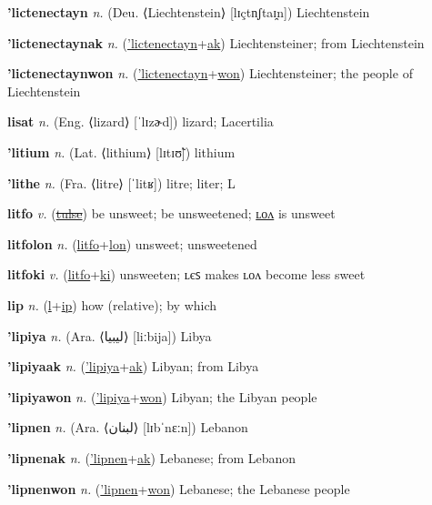 \textbf{\hypertarget{'lictenectayn}{'lictenectayn}} \textit{n.} (Deu. ⟨Liechtenstein⟩ [lɪçtn̩ʃtaɪ̯n])
Liechtenstein

\textbf{\hypertarget{'lictenectaynak}{'lictenectaynak}} \textit{n.} (\hyperlink{'lictenectayn}{'lictenectayn}+\allowbreak \hyperlink{ak}{ak})
Liechtensteiner; from Liechtenstein

\textbf{\hypertarget{'lictenectaynwon}{'lictenectaynwon}} \textit{n.} (\hyperlink{'lictenectayn}{'lictenectayn}+\allowbreak \hyperlink{won}{won})
Liechtensteiner; the people of Liechtenstein

\textbf{\hypertarget{lisat}{lisat}} \textit{n.} (Eng. ⟨lizard⟩ [ˈlɪzɚd])
lizard; Lacertilia

\textbf{\hypertarget{'litium}{'litium}} \textit{n.} (Lat. ⟨lithium⟩ [lɪtɪʊ̃])
lithium

\textbf{\hypertarget{'lithe}{'lithe}} \textit{n.} (Fra. ⟨litre⟩ [ˈlitʁ])
litre; liter; L

\textbf{\hypertarget{litfo}{litfo}} \textit{v.} (\hyperlink{tulse}{\sout{tulse}})
be unsweet; be unsweetened; \hyperlink{litfolon}{ʟᴏᴧ} is unsweet

\textbf{\hypertarget{litfolon}{litfolon}} \textit{n.} (\hyperlink{litfo}{litfo}+\allowbreak \hyperlink{lon}{lon})
unsweet; unsweetened

\textbf{\hypertarget{litfoki}{litfoki}} \textit{v.} (\hyperlink{litfo}{litfo}+\allowbreak \hyperlink{ki}{ki})
unsweeten; ʟєꜱ makes ʟᴏᴧ become less sweet

\textbf{\hypertarget{lip}{lip}} \textit{n.} (\hyperlink{l}{l}+\allowbreak \hyperlink{ip}{ip})
how (relative); by which

\textbf{\hypertarget{'lipiya}{'lipiya}} \textit{n.} (Ara. ⟨{\arabics{}ليبيا‎}⟩ [liːbija])
Libya

\textbf{\hypertarget{'lipiyaak}{'lipiyaak}} \textit{n.} (\hyperlink{'lipiya}{'lipiya}+\allowbreak \hyperlink{ak}{ak})
Libyan; from Libya

\textbf{\hypertarget{'lipiyawon}{'lipiyawon}} \textit{n.} (\hyperlink{'lipiya}{'lipiya}+\allowbreak \hyperlink{won}{won})
Libyan; the Libyan people

\textbf{\hypertarget{'lipnen}{'lipnen}} \textit{n.} (Ara. ⟨{\arabics{}لبنان‎}⟩ [lɪbˈnɛːn])
Lebanon

\textbf{\hypertarget{'lipnenak}{'lipnenak}} \textit{n.} (\hyperlink{'lipnen}{'lipnen}+\allowbreak \hyperlink{ak}{ak})
Lebanese; from Lebanon

\textbf{\hypertarget{'lipnenwon}{'lipnenwon}} \textit{n.} (\hyperlink{'lipnen}{'lipnen}+\allowbreak \hyperlink{won}{won})
Lebanese; the Lebanese people

